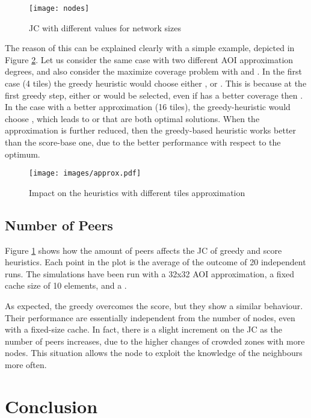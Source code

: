 \documentclass[final,10pt,a5paper]{phdimt}
\theoremstyle{definition}
\begin{document}
\begin{figure}[tbh]
\centering
\texttt{[image: nodes]}
\caption{JC with different values for network sizes}
\label{graph:scal}
\end{figure}


The reason of this can be explained clearly with a simple example, depicted in Figure \ref{fig:approx}.
Let us consider the same case with two different AOI approximation degrees, and also consider the maximize coverage problem with
 and . In the first case (4 tiles) the greedy heuristic would choose either ,  or . This is because at the first greedy step, either  or  would be selected, even if  has a better coverage then .
In the case with a better approximation (16 tiles), the greedy-heuristic would choose , which leads to  or  that are both optimal solutions. When the approximation is further reduced, then the greedy-based heuristic works better than the score-base one, due to the better performance with respect to the optimum.


\begin{figure}[tbh]
\centering
\texttt{[image: images/approx.pdf]}
\caption{Impact on the heuristics with different tiles approximation}\label{fig:approx}
\end{figure}



\subsection{Number of Peers}

Figure \ref{graph:scal} shows how the amount of peers affects the JC of greedy and score heuristics.
Each point in the plot is the average of the outcome of 20 independent runs. The simulations have been run with a 32x32 AOI approximation, a fixed cache size of 10 elements, and a .

As expected, the greedy overcomes the score, but they show a similar behaviour. 
Their performance are essentially independent from the number of nodes, even with a fixed-size cache.
In fact, there is a slight increment on the JC as the number of peers increases, due to the higher changes of crowded zones with more nodes.
This situation allows the node to exploit the knowledge of the neighbours more often.




\section{Conclusion}
\end{document}
